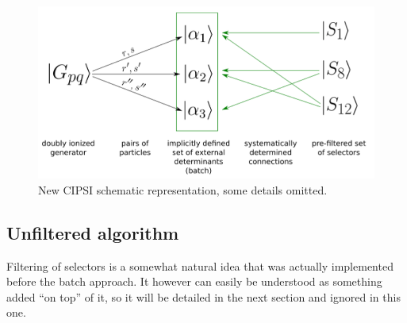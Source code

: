 \documentclass[./thesis.tex]{subfiles}
\begin{document}
\begin{figure}[h!]
        \begin{center}
                \includegraphics[width=0.6\columnwidth]{figures/cipsi/new_cipsi}
        \end{center}
        \caption{New CIPSI schematic representation, some details omitted.}
        \label{fig:new_cipsi}
\end{figure}

\subsection{Unfiltered algorithm}

Filtering of selectors is a somewhat natural idea that was actually implemented before the batch approach. It however can easily be understood as something added ``on top'' of it, so it will be detailed in the next section and ignored in this one.
\end{document}
